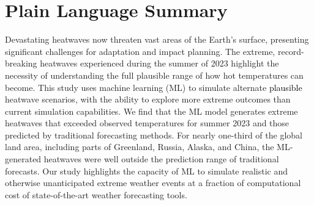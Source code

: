 \documentclass[draft]{agujournal2019}
\renewcommand{\st}[1]{\unskip}
\newcommand{\newTxt}{\textcolor{black}}
\begin{document}
\section*{Plain Language Summary}
\noindent Devastating heatwaves now threaten vast areas of the Earth's surface, presenting significant challenges for adaptation and impact planning. The extreme, record-breaking heatwaves experienced during the summer of 2023 highlight the necessity of understanding the full plausible range of how hot temperatures can become.
This study uses machine learning (ML) to simulate alternate \newTxt{plausible} heatwave scenarios, with the ability to explore more extreme outcomes than current simulation capabilities.
We find that the ML model generates extreme heatwaves that exceeded observed temperatures for summer 2023 and those predicted by traditional forecasting methods. For nearly one-third of the global land area, including parts of Greenland, Russia, Alaska, and China, the ML-generated heatwaves were well outside the prediction range of traditional forecasts. 
\st{We furthermore show how the ML model yields important information about the risks associated with humid heat extremes.}
Our study highlights the capacity of ML to simulate realistic and otherwise unanticipated extreme weather events at a fraction of computational cost of state-of-the-art weather forecasting tools.
\end{document}
